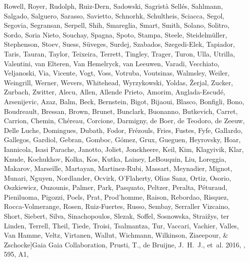 \documentclass[twocolumn]{aastex62}
\begin{document}
\begin{thebibliography}{}
{  {Rowell}, {Royer}, {Rudolph}, {Ruiz-Dern}, {Sadowski}, {Sagrist{\`a}
  Sell{\'e}s}, {Sahlmann}, {Salgado}, {Salguero}, {Sarasso}, {Savietto},
  {Schnorhk}, {Schultheis}, {Sciacca}, {Segol}, {Segovia}, {Segransan},
  {Serpell}, {Shih}, {Smareglia}, {Smart}, {Smith}, {Solano}, {Solitro},
  {Sordo}, {Soria Nieto}, {Souchay}, {Spagna}, {Spoto}, {Stampa}, {Steele},
  {Steidelm{\"u}ller}, {Stephenson}, {Stoev}, {Suess}, {S{\"u}veges}, {Surdej},
  {Szabados}, {Szegedi-Elek}, {Tapiador}, {Taris}, {Tauran}, {Taylor},
  {Teixeira}, {Terrett}, {Tingley}, {Trager}, {Turon}, {Ulla}, {Utrilla},
  {Valentini}, {van Elteren}, {Van Hemelryck}, {van Leeuwen}, {Varadi},
  {Vecchiato}, {Veljanoski}, {Via}, {Vicente}, {Vogt}, {Voss}, {Votruba},
  {Voutsinas}, {Walmsley}, {Weiler}, {Weingrill}, {Werner}, {Wevers},
  {Whitehead}, {Wyrzykowski}, {Yoldas}, {{\v{Z}}erjal}, {Zucker}, {Zurbach},
  {Zwitter}, {Alecu}, {Allen}, {Allende Prieto}, {Amorim},
  {Anglada-Escud{\'e}}, {Arsenijevic}, {Azaz}, {Balm}, {Beck}, {Bernstein},
  {Bigot}, {Bijaoui}, {Blasco}, {Bonfigli}, {Bono}, {Boudreault}, {Bressan},
  {Brown}, {Brunet}, {Bunclark}, {Buonanno}, {Butkevich}, {Carret}, {Carrion},
  {Chemin}, {Ch{\'e}reau}, {Corcione}, {Darmigny}, {de Boer}, {de Teodoro}, {de
  Zeeuw}, {Delle Luche}, {Domingues}, {Dubath}, {Fodor}, {Fr{\'e}zouls},
  {Fries}, {Fustes}, {Fyfe}, {Gallardo}, {Gallegos}, {Gardiol}, {Gebran},
  {Gomboc}, {G{\'o}mez}, {Grux}, {Gueguen}, {Heyrovsky}, {Hoar}, {Iannicola},
  {Isasi Parache}, {Janotto}, {Joliet}, {Jonckheere}, {Keil}, {Kim},
  {Klagyivik}, {Klar}, {Knude}, {Kochukhov}, {Kolka}, {Kos}, {Kutka}, {Lainey},
  {LeBouquin}, {Liu}, {Loreggia}, {Makarov}, {Marseille}, {Martayan},
  {Martinez-Rubi}, {Massart}, {Meynadier}, {Mignot}, {Munari}, {Nguyen},
  {Nordlander}, {Ocvirk}, {O'Flaherty}, {Olias Sanz}, {Ortiz}, {Osorio},
  {Oszkiewicz}, {Ouzounis}, {Palmer}, {Park}, {Pasquato}, {Peltzer}, {Peralta},
  {P{\'e}turaud}, {Pieniluoma}, {Pigozzi}, {Poels}, {Prat}, {Prod'homme},
  {Raison}, {Rebordao}, {Risquez}, {Rocca-Volmerange}, {Rosen}, {Ruiz-Fuertes},
  {Russo}, {Sembay}, {Serraller Vizcaino}, {Short}, {Siebert}, {Silva},
  {Sinachopoulos}, {Slezak}, {Soffel}, {Sosnowska}, {Strai{\v{z}}ys}, {ter
  Linden}, {Terrell}, {Theil}, {Tiede}, {Troisi}, {Tsalmantza}, {Tur},
  {Vaccari}, {Vachier}, {Valles}, {Van Hamme}, {Veltz}, {Virtanen}, {Wallut},
  {Wichmann}, {Wilkinson}, {Ziaeepour}, \& {Zschocke}}]{Gaia}
{Gaia Collaboration}, {Prusti}, T., {de Bruijne}, J.~H.~J., {et~al.} 2016,
  \aap, 595, A1, 


\end{thebibliography}
\end{document}
